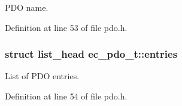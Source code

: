 \-P\-D\-O name. 



\-Definition at line 53 of file pdo.\-h.

\subsubsection[{entries}]{\setlength{\rightskip}{0pt plus 5cm}struct list\-\_\-head {\bf ec\-\_\-pdo\-\_\-t\-::entries}}\label{structec__pdo__t_aaac321c4f80081e5f69e2ff30eac80e5}


\-List of \-P\-D\-O entries. 



\-Definition at line 54 of file pdo.\-h.

